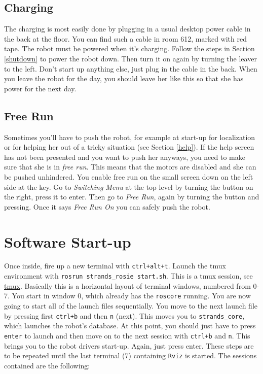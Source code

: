 \documentclass[a4paper,11pt]{article}
\begin{document}
\subsection{Charging}
The charging is most easily done by plugging in a usual desktop power cable in the 
back at the floor. You can find such a cable in room 612, marked with red tape.
The robot must be powered when it's charging. Follow the steps in Section \ref{shutdown} to power the robot down. Then turn it on again by turning the
leaver to the left. Don't start up anything else, just plug in the cable in the back. When you leave the robot for the day, you should leave her like this
so that she has power for the next day.

\subsection{Free Run}
Sometimes you'll have to push the robot, for example at start-up for localization
or for helping her out of a tricky situation (see Section \ref{help}).
If the help screen has not been presented and you want to push her anyways,
you need to make sure that she is in \textit{free run}. This means that
the motors are disabled and she can be pushed unhindered. You enable free run
on the small screen down on the left side at the key. Go to \textit{Switching Menu}
at the top level by turning the button on the right, press it to enter. Then
go to \textit{Free Run}, again by turning the button and pressing. Once it says
\textit{Free Run On} you can safely push the robot.

\section{Software Start-up}
\label{startup}

Once inside, fire up a new terminal with \texttt{ctrl+alt+t}. Launch the tmux environment with \texttt{rosrun strands\_rosie start.sh}. This is a tmux session, see \href{https://www.digitalocean.com/community/tutorials/how-to-install-and-use-tmux-on-ubuntu-12-10--2}{tmux}. Basically this is a horizontal layout of terminal windows, numbered from 0-7. You start in window 0, which already has the  \texttt{roscore} running. You are now going to start all of the launch files sequentially. You move to the next launch file by pressing first \texttt{ctrl+b} and then \texttt{n} (next). This moves you to \texttt{strands\_core}, which launches the robot's database. At this point, you should just have to press \texttt{enter} to launch and then move on to the next session with \texttt{ctrl+b} and \texttt{n}. This brings you to the robot drivers start-up. Again, just press enter. These steps are to be repeated until the last terminal (7) containing \texttt{Rviz} is started. The sessions contained are the following:
\end{document}
